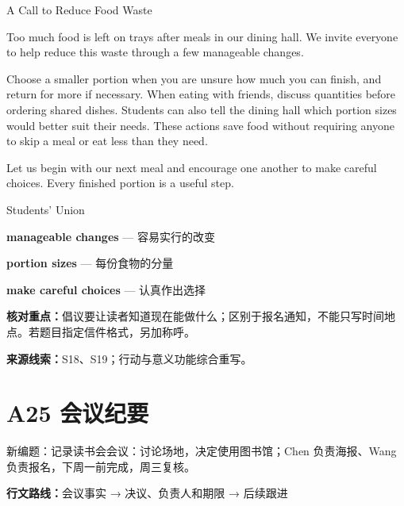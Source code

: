 \documentclass[11pt,a4paper,fontset=macnew]{ctexart}
\newenvironment{example}{\begingroup\fontsize{11}{14.3}\selectfont\setlength{\parskip}{4pt}}{\par\endgroup}
\begin{document}
\begin{example}
{\centering A Call to Reduce Food Waste\par}
Too much food is left on trays after meals in our dining hall. We invite everyone to help reduce this waste through a few manageable changes.

Choose a smaller portion when you are unsure how much you can finish, and return for more if necessary. When eating with friends, discuss quantities before ordering shared dishes. Students can also tell the dining hall which portion sizes would better suit their needs. These actions save food without requiring anyone to skip a meal or eat less than they need.

Let us begin with our next meal and encourage one another to make careful choices. Every finished portion is a useful step.

\noindent Students' Union\par
\end{example}
\par\vspace{4pt}{\bfseries 好词好句：优先记这三处}\par\nopagebreak
{\small\textbf{manageable changes} — 容易实行的改变}\par
{\small\textbf{portion sizes} — 每份食物的分量}\par
{\small\textbf{make careful choices} — 认真作出选择}\par
{\small\textbf{核对重点：}倡议要让读者知道现在能做什么；区别于报名通知，不能只写时间地点。若题目指定信件格式，另加称呼。}\par
{\fontsize{8}{10}\selectfont\textbf{来源线索：}S18、S19；行动与意义功能综合重写。}\par
\clearpage\section*{A25  会议纪要}
{\small 新编题：记录读书会会议：讨论场地，决定使用图书馆；Chen 负责海报、Wang 负责报名，下周一前完成，周三复核。}\par
{\small\textbf{行文路线：}会议事实 → 决议、负责人和期限 → 后续跟进}\par
\par\vspace{4pt}{\bfseries 可替换模板}\par\nopagebreak
\end{document}
